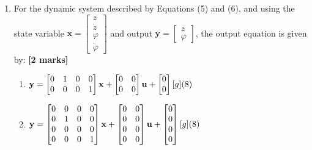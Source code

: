 \documentclass{article}
\begin{document}
\begin{enumerate}[resume]
\begin{enumerate}[label=\alph*.]
    \item None of the above.
    \end{enumerate}

    \item For the dynamic system described by Equations (5) and (6), and using the state variable $\mathbf{x} = \begin{bmatrix} z \\ \dot{z} \\ \varphi \\ \dot{\varphi} \end{bmatrix}$ and output $\mathbf{y} = \begin{bmatrix} z \\ \varphi \end{bmatrix}$, the output equation is given by: \hfill \textbf{[2 marks]}
    
    \begin{enumerate}[label=\alph*.]
        \item $\mathbf{y} = \begin{bmatrix} 0 & 1 & 0 & 0 \\ 0 & 0 & 0 & 1 \end{bmatrix} \mathbf{x} + \begin{bmatrix} 0 & 0 \\ 0 & 0 \end{bmatrix} \mathbf{u} + \begin{bmatrix} 0 \\ 0 \end{bmatrix} [g] \hfill (8)$
        \vspace{2mm}

        \item $\mathbf{y} = \begin{bmatrix} 0 & 0 & 0 & 0 \\ 0 & 1 & 0 & 0 \\ 0 & 0 & 0 & 0 \\ 0 & 0 & 0 & 1 \end{bmatrix} \mathbf{x} + \begin{bmatrix} 0 & 0 \\ 0 & 0 \\ 0 & 0 \\ 0 & 0 \end{bmatrix} \mathbf{u} + \begin{bmatrix} 0 \\ 0 \\ 0 \\ 0 \end{bmatrix} [g] \hfill (8)$
        \vspace{2mm}


\end{enumerate}
\end{enumerate}
\end{document}
